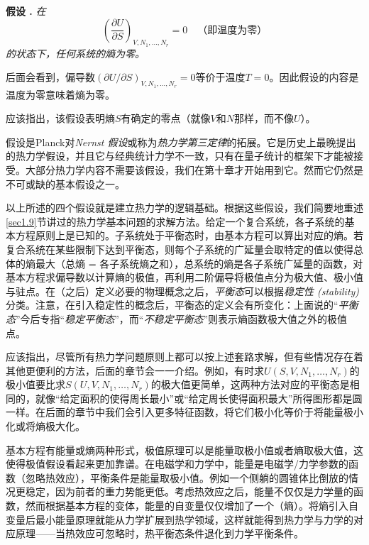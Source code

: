 {\bf 假设 \uppercase\expandafter{}. } {\it 
在\[ \left( \frac{\partial U}{\partial S} \right)_{V, N_1, \dots, N_r} = 0 \quad \text{（即温度为零）} \]的状态下，任何系统的熵为零。
}

后面会看到，偏导数$(\partial U / \partial S)_{V, N_1, \dots, N_r} = 0$等价于温度$T = 0$。因此假设\uppercase\expandafter{}的内容是温度为零意味着熵为零。

应该指出，该假设表明熵$S$有确定的零点（就像$V$和$N$那样，而不像$U$）。

假设\uppercase\expandafter{}是Planck对{\it Nernst 假设}或称为{\it 热力学第三定律}的拓展。它是历史上最晚提出的热力学假设，并且它与经典统计力学不一致，只有在量子统计的框架下才能被接受。大部分热力学内容不需要该假设，我们在第十章才开始用到它。然而它仍然是不可或缺的基本假设之一。

以上所述的四个假设就是建立热力学的逻辑基础。根据这些假设，我们简要地重述\ref{sec1.9}节讲过的热力学基本问题的求解方法。给定一个复合系统，各子系统的基本方程原则上是已知的。子系统处于平衡态时，由基本方程可以算出对应的熵。若复合系统在某些限制下达到平衡态，则每个子系统的广延量会取特定的值以使得总体的熵最大（总熵 = 各子系统熵之和），总系统的熵是各子系统广延量的函数，对基本方程求偏导数以计算熵的极值，再利用二阶偏导将极值点分为极大值、极小值与驻点。在（之后）定义必要的物理概念之后，{\it 平衡态}可以根据{\it 稳定性 (stability)}分类。注意，在引入稳定性的概念后，平衡态的定义会有所变化：上面说的“{\it 平衡态}”今后专指“{\it 稳定平衡态}”，而“{\it 不稳定平衡态}”则表示熵函数极大值之外的极值点。

应该指出，尽管所有热力学问题原则上都可以按上述套路求解，但有些情况存在着其他更便利的方法，后面的章节会一一介绍。例如，有时求$U(S, V, N_1, \dots, N_r)$的极小值要比求$S(U, V, N_1, \dots, N_r)$的极大值更简单，这两种方法对应的平衡态是相同的，就像“给定面积的使得周长最小”或“给定周长使得面积最大”所得图形都是圆一样。在后面的章节中我们会引入更多特征函数，将它们极小化等价于将能量极小化或将熵极大化。

基本方程有能量或熵两种形式，极值原理可以是能量取极小值或者熵取极大值，这使得极值假设看起来更加靠谱。在电磁学和力学中，能量是电磁学/力学参数的函数（忽略热效应），平衡条件是能量取极小值。例如一个侧躺的圆锥体比倒放的情况更稳定，因为前者的重力势能更低。考虑热效应之后，能量不仅仅是力学量的函数，然而根据基本方程的变体，能量的自变量仅仅增加了一个（熵）。将熵引入自变量后最小能量原理就能从力学扩展到热学领域，这样就能得到热力学与力学的对应原理——当热效应可忽略时，热平衡态条件退化到力学平衡条件。

